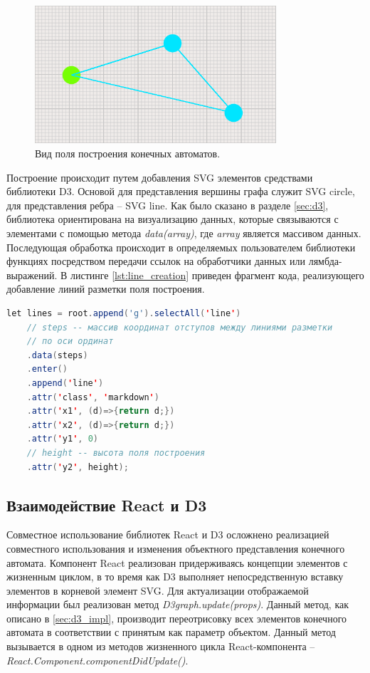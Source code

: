 \begin{figure}[htbp]
	\centering
	\includegraphics[width=0.8\textwidth]{fig/graph.png}
	\caption{Вид поля построения конечных автоматов.}
	\label{fig:graph}
\end{figure}

Построение происходит путем добавления SVG элементов средствами библиотеки D3. Основой для представления вершины графа служит SVG circle, для представления ребра -- SVG line. Как было сказано в разделе \ref{sec:d3}, библиотека ориентирована на визуализацию данных, которые связываются с элементами с помощью метода \textit{data(array)}, где \textit{array} является массивом данных. Последующая обработка происходит в определяемых пользователем библиотеки функциях посредством передачи ссылок на обработчики данных или лямбда-выражений. В листинге \ref{lst:line_creation} приведен фрагмент кода, реализующего добавление линий разметки поля построения.

\begin{lstlisting}[language=Java,
				   label=lst:line_creation,
				   caption={Добавление разметки поля построения конечных автоматов.}]
let lines = root.append('g').selectAll('line')
	// steps -- массив координат отступов между линиями разметки 
	// по оси ординат
	.data(steps) 
	.enter()
	.append('line')
	.attr('class', 'markdown')
	.attr('x1', (d)=>{return d;})
	.attr('x2', (d)=>{return d;})
	.attr('y1', 0)
	// height -- высота поля построения
	.attr('y2', height);
\end{lstlisting}

\subsection{Взаимодействие React и D3}

Совместное использование библиотек React и D3 осложнено реализацией совместного использования и изменения объектного представления конечного автомата. Компонент React реализован придерживаясь концепции элементов с жизненным циклом, в то время как D3 выполняет непосредственную вставку элементов в корневой элемент SVG. Для актуализации отображаемой информации был реализован метод \textit{D3graph.update(props)}. Данный метод, как описано в \ref{sec:d3_impl}, производит переотрисовку всех элементов конечного автомата в соответствии с принятым как параметр объектом. Данный метод вызывается в одном из методов жизненного цикла React-компонента -- \textit{React.Component.componentDidUpdate()}.

